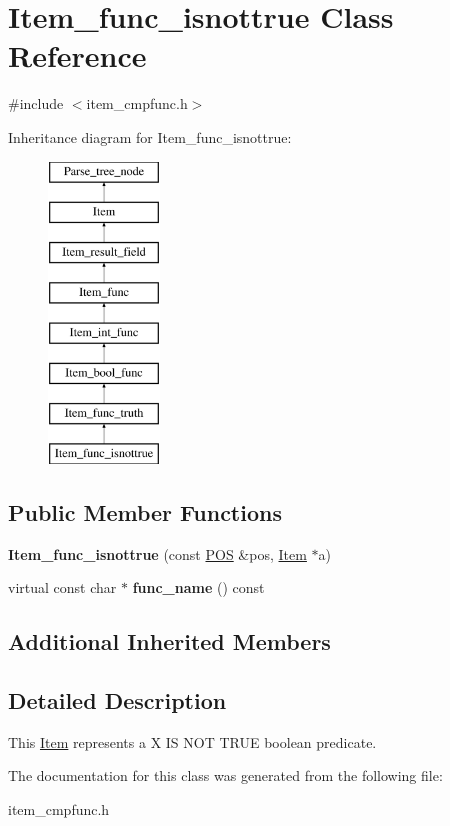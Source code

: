\hypertarget{classItem__func__isnottrue}{}\section{Item\+\_\+func\+\_\+isnottrue Class Reference}
\label{classItem__func__isnottrue}


{\ttfamily \#include $<$item\+\_\+cmpfunc.\+h$>$}

Inheritance diagram for Item\+\_\+func\+\_\+isnottrue\+:\begin{figure}[H]
\begin{center}
\leavevmode
\includegraphics[height=8.000000cm]{classItem__func__isnottrue}
\end{center}
\end{figure}
\subsection*{Public Member Functions}
\begin{DoxyCompactItemize}
\item 
\mbox{\label{classItem__func__isnottrue_a6eaed96366465a61536a79e5d7ed1c5b}} 
{\bfseries Item\+\_\+func\+\_\+isnottrue} (const \mbox{\hyperlink{structYYLTYPE}{P\+OS}} \&pos, \mbox{\hyperlink{classItem}{Item}} $\ast$a)
\item 
\mbox{\label{classItem__func__isnottrue_aaae9b0c0873317db236f9b8e59386bde}} 
virtual const char $\ast$ {\bfseries func\+\_\+name} () const
\end{DoxyCompactItemize}
\subsection*{Additional Inherited Members}


\subsection{Detailed Description}
This \mbox{\hyperlink{classItem}{Item}} represents a {\ttfamily X IS N\+OT T\+R\+UE} boolean predicate. 

The documentation for this class was generated from the following file\+:\begin{DoxyCompactItemize}
\item 
item\+\_\+cmpfunc.\+h\end{DoxyCompactItemize}
